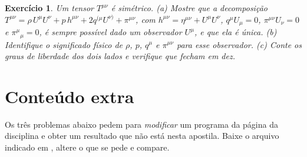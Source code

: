 \documentclass[12pt,a4paper,oneside]{book}
\theoremstyle{rgplain}
\newtheorem{exercise}{Exercício}[chapter]
\theoremstyle{rgremark}
\begin{document}
\begin{exercise}
Um tensor $T^{\mu\nu}$ é simétrico. (a) Mostre que a decomposição
$T^{\mu\nu}=\rho\,U^\mu U^\nu+p\,h^{\mu\nu}+2q^{(\mu}U^{\nu)}+\pi^{\mu\nu}$,
com $h^{\mu\nu}=\eta^{\mu\nu}+U^\mu U^\nu$, $q^\mu U_\mu=0$,
$\pi^{\mu\nu}U_\nu=0$ e $\pi^\mu{}_\mu=0$, é sempre possível dado um
observador $U^\mu$, e que ela é única. (b) Identifique o significado físico
de $\rho$, $p$, $q^\mu$ e $\pi^{\mu\nu}$ para esse observador. (c) Conte os
graus de liberdade dos dois lados e verifique que fecham em dez.
\end{exercise}


\section{Conteúdo extra}
\label{sec:extra-tensores}

Os três problemas abaixo pedem para \emph{modificar} um programa da página da disciplina e obter um resultado que não está nesta apostila. Baixe o arquivo indicado em \href{\rgsitecodigos}{\texttt{\rgsitecodigos}}, altere o que se pede e compare.
\end{document}
